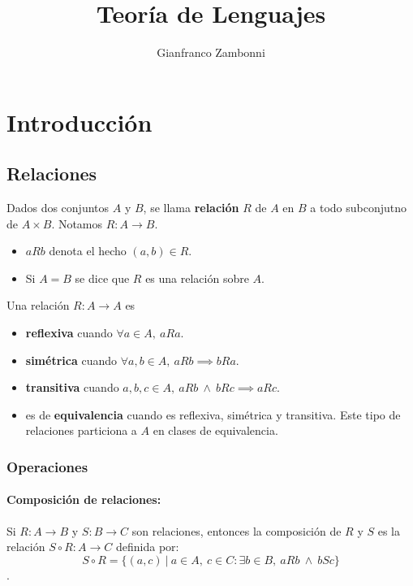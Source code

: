 

\title{Teoría de Lenguajes}
\author{Gianfranco Zambonni}


\newtheorem{definicion}{Definición}[section]
\newtheorem{teorema}{Teorema}[section]
\newtheorem{corolario}{Corolario}[section]
\newtheorem{proposicion}{Proposición}[section]
\newtheorem{propiedad}{Propiedad}[section]
\newtheorem{lema}{Lema}[section]


\maketitle
\tableofcontents
\newpage
\section{Introducción}
\subsection{Relaciones}
Dados dos conjuntos \(A\) y \(B\), se llama \textbf{relación} \(R\) de \(A\) en \(B\) a todo subconjutno de \(A\times B\). Notamos \(R:A\to B\).
\begin{itemize}
  \item \(aRb\) denota el hecho \((a,b)\in R\).
  \item Si \(A = B\) se dice que \(R\) es una relación sobre \(A\).
\end{itemize}

\noindent Una relación \(R: A\to A\) es
\begin{itemize}
  \item   \textbf{reflexiva} cuando \(\forall a\in A,~aRa\).
  \item \textbf{simétrica} cuando \(\forall a,b\in A,~aRb \implies bRa\).
  \item \textbf{transitiva} cuando \(a,b,c\in A,~aRb~\land~bRc\implies aRc\).
  \item es de \textbf{equivalencia} cuando es reflexiva, simétrica y transitiva. Este tipo de relaciones particiona a \(A\) en clases de equivalencia.
\end{itemize}

\subsubsection{Operaciones}
\paragraph{Composición de relaciones:} Si \(R:A\to B\) y \(S:B\to C\) son relaciones, entonces la composición de \(R\) y \(S\) es la relación \(S\circ R:A\to C\) definida por:
\[S\circ R = \{(a,c)~|~a\in A,~c\in C : \exists b\in B,~aRb~\land~bSc\}\].

